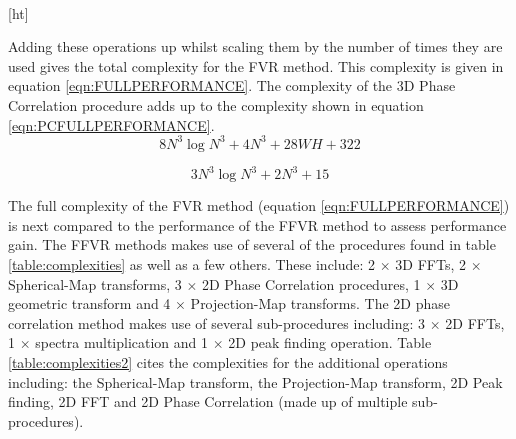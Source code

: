 \begin{table}[ht]
\centering
{}
\\
\caption{Complexities for given Procedures}
\label{table:complexities}
\end{table}[ht]


Adding these operations up whilst scaling them by the number of times they are used gives the total complexity for the FVR method. This complexity is given in equation \ref{eqn:FULLPERFORMANCE}. The complexity of the 3D Phase Correlation procedure adds up to the complexity shown in equation \ref{eqn:PCFULLPERFORMANCE}. \\

\begin{equation} \label{eqn:FULLPERFORMANCE}
8N^3\log{N^3} + 4N^3 + 28WH + 322
\end{equation}

\begin{equation} \label{eqn:PCFULLPERFORMANCE}
3N^3\log{N^3} + 2N^3 + 15
\end{equation}


The full complexity of the FVR method (equation \ref{eqn:FULLPERFORMANCE}) is next compared to the performance of the FFVR method to assess performance gain. The FFVR methods makes use of several of the procedures found in table \ref{table:complexities} as well as a few others. These include: 2 $\times$ 3D FFTs, 2 $\times$ Spherical-Map transforms, 3 $\times$ 2D Phase Correlation procedures, 1 $\times$ 3D geometric transform and 4 $\times$ Projection-Map transforms. The 2D phase correlation method makes use of several sub-procedures including: 3 $\times$ 2D FFTs, 1 $\times$ spectra multiplication and 1 $\times$ 2D peak finding operation. Table \ref{table:complexities2} cites the complexities for the additional operations including: the Spherical-Map transform, the Projection-Map transform, 2D Peak finding, 2D FFT and 2D Phase Correlation (made up of multiple sub-procedures). \\



